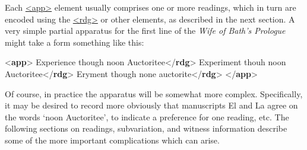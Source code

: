 Each \hyperref[TEI.app]{<app>} element usually comprises one or more readings, which in turn are encoded using the \hyperref[TEI.rdg]{<rdg>} or other elements, as described in the next section. A very simple partial apparatus for the first line of the \textit{Wife of Bath's Prologue} might take a form something like this: \par\bgroup{}\exampleFont \begin{shaded}\noindent\mbox{}{<\textbf{app}>}\mbox{}\newline 
{}Experience though noon Auctoritee{</\textbf{rdg}>}\mbox{}\newline 
{}Experiment thouh noon Auctoritee{</\textbf{rdg}>}\mbox{}\newline 
{}Eryment though none auctorite{</\textbf{rdg}>}\mbox{}\newline 
{</\textbf{app}>}\end{shaded}\egroup\par \noindent  Of course, in practice the apparatus will be somewhat more complex. Specifically, it may be desired to record more obviously that manuscripts El and La agree on the words ‘noon Auctoritee’, to indicate a preference for one reading, etc. The following sections on readings, subvariation, and witness information describe some of the more important complications which can arise.
